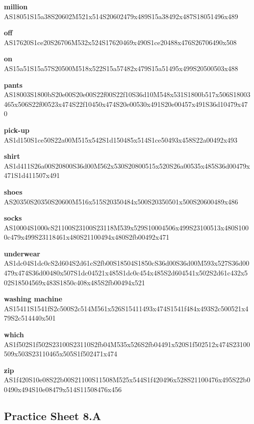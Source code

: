\documentclass{article}
\begin{document}
\begin{glossary}
\textbf{million}\\
AS18051S15a38S20602M521x514S20602479x489S15a38492x487S18051496x489

\textbf{off}\\
AS17620S1ce20S26706M532x524S17620469x490S1ce20488x476S26706490x508

\textbf{on}\\
AS15a51S15a57S20500M518x522S15a57482x479S15a51495x499S20500503x488

\textbf{pants}\\
AS18003S1800bS20e00S20e00S22f00S22f10S36d10M548x531S1800b517x506S18003465x506S22f00523x474S22f10450x474S20e00530x491S20e00457x491S36d10479x470

\textbf{pick-up}\\
AS1d150S1ce50S22a00M515x542S1d150485x514S1ce50493x458S22a00492x493

\textbf{shirt}\\
AS1d411S26a00S20800S36d00M562x530S20800515x520S26a00535x485S36d00479x471S1d411507x491

\textbf{shoes}\\
AS20350S20350S20600M516x515S20350484x500S20350501x500S20600489x486

\textbf{socks}\\
AS10004S1000cS21100S23100S23118M539x529S10004506x499S23100513x480S1000c479x499S23118461x480S21100494x480S2fb00492x471

\textbf{underwear}\\
AS1dc04S1dc0cS2d604S2d61cS2fb00S18504S1850cS36d00S36d00M593x527S36d00479x474S36d00480x507S1dc04521x485S1dc0c454x485S2d604541x502S2d61c432x502S18504569x483S1850c408x485S2fb00494x521

\textbf{washing machine}\\
AS15411S1541fS2c500S2c514M561x526S15411493x474S1541f484x493S2c500521x479S2c514440x501

\textbf{which}\\
AS1f502S1f502S23100S23110S2fb04M535x526S2fb04491x520S1f502512x474S23100509x503S23110465x505S1f502471x474

\textbf{zip}\\
AS1f420S10e08S22b00S21100S11508M525x544S1f420496x528S21100476x495S22b00490x494S10e08479x514S11508476x456

\end{glossary}

\subsection{Practice Sheet 8.A}
\end{document}
